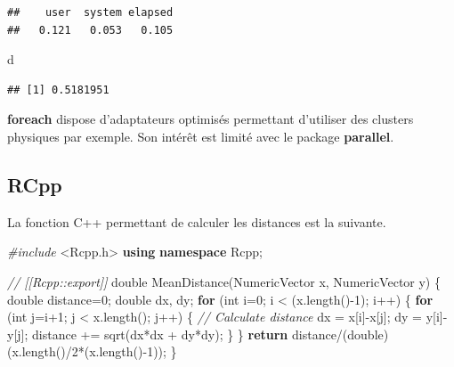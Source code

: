 \documentclass[
  12pt,
  french,
  a4paper,
  extrafontsizes,onecolumn,openright
  ]{memoir}
\newenvironment{Shaded}{\begin{snugshade}}{\end{snugshade}}
\newcommand{\CommentTok}[1]{\textcolor[rgb]{0.56,0.35,0.01}{\textit{#1}}}
\newcommand{\ControlFlowTok}[1]{\textcolor[rgb]{0.13,0.29,0.53}{\textbf{#1}}}
\newcommand{\DataTypeTok}[1]{\textcolor[rgb]{0.13,0.29,0.53}{#1}}
\newcommand{\DecValTok}[1]{\textcolor[rgb]{0.00,0.00,0.81}{#1}}
\newcommand{\ImportTok}[1]{#1}
\newcommand{\KeywordTok}[1]{\textcolor[rgb]{0.13,0.29,0.53}{\textbf{#1}}}
\newcommand{\NormalTok}[1]{#1}
\newcommand{\PreprocessorTok}[1]{\textcolor[rgb]{0.56,0.35,0.01}{\textit{#1}}}
\begin{document}
\begin{verbatim}
##    user  system elapsed 
##   0.121   0.053   0.105
\end{verbatim}

\begin{Shaded}
\begin{Highlighting}[]
\NormalTok{d}
\end{Highlighting}
\end{Shaded}

\begin{verbatim}
## [1] 0.5181951
\end{verbatim}

\normalsize

\textbf{foreach} dispose d'adaptateurs optimisés permettant d'utiliser des clusters physiques par exemple.
Son intérêt est limité avec le package \textbf{parallel}.

\hypertarget{rcpp}{%
\subsection{RCpp}\label{rcpp}}

La fonction C++ permettant de calculer les distances est la suivante.

\scriptsize

\begin{Shaded}
\begin{Highlighting}[]
\PreprocessorTok{#include }\ImportTok{<Rcpp.h>}
\KeywordTok{using} \KeywordTok{namespace}\NormalTok{ Rcpp;}

\CommentTok{// [[Rcpp::export]]}
\DataTypeTok{double}\NormalTok{ MeanDistance(NumericVector x, NumericVector y) \{}
  \DataTypeTok{double}\NormalTok{ distance=}\DecValTok{0}\NormalTok{;}
  \DataTypeTok{double}\NormalTok{ dx, dy;}
  \ControlFlowTok{for}\NormalTok{ (}\DataTypeTok{int}\NormalTok{ i=}\DecValTok{0}\NormalTok{; i < (x.length()-}\DecValTok{1}\NormalTok{); i++) \{}
    \ControlFlowTok{for}\NormalTok{ (}\DataTypeTok{int}\NormalTok{ j=i+}\DecValTok{1}\NormalTok{; j < x.length(); j++) \{}
    \CommentTok{// Calculate distance}
\NormalTok{        dx = x[i]-x[j];}
\NormalTok{        dy = y[i]-y[j];}
\NormalTok{        distance += sqrt(dx*dx + dy*dy);}
\NormalTok{    \}}
\NormalTok{  \}}
  \ControlFlowTok{return}\NormalTok{ distance/(}\DataTypeTok{double}\NormalTok{)(x.length()/}\DecValTok{2}\NormalTok{*(x.length()-}\DecValTok{1}\NormalTok{));}
\NormalTok{\}}
\end{Highlighting}
\end{Shaded}
\end{document}
